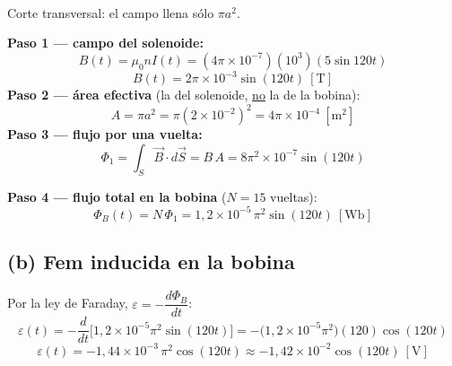 \documentclass[12pt,letterpaper]{article}
\begin{document}
\medskip
\noindent
\begin{minipage}[t]{0.36\textwidth}
\centering\vspace{0pt}
\\[2pt]
{\footnotesize Corte transversal: el campo llena s\'olo $\pi a^2$.}
\end{minipage}%
\hfill
\begin{minipage}[t]{0.60\textwidth}
\vspace{0pt}
\textbf{Paso 1 — campo del solenoide:}
\[
    B(t)=\mu_0 n I(t)=(4\pi\times10^{-7})(10^{3})(5\sin 120t)
\]
\[
    B(t)=2\pi\times10^{-3}\sin(120t)\ [\text{T}]
\]
\textbf{Paso 2 — \'area efectiva} (la del solenoide, \underline{no} la de la bobina):
\[
    A=\pi a^{2}=\pi(2\times10^{-2})^{2}=4\pi\times10^{-4}\ [\text{m}^2]
\]
\textbf{Paso 3 — flujo por una vuelta:}
\[
    \Phi_1=\int_S\vec B\cdot d\vec S=B\,A=8\pi^{2}\times10^{-7}\sin(120t)
\]
\end{minipage}

\medskip
\noindent\textbf{Paso 4 — flujo total en la bobina} ($N=15$ vueltas):
\[
    \boxed{\Phi_B(t)=N\,\Phi_1=1{,}2\times10^{-5}\,\pi^{2}\sin(120t)\ [\text{Wb}]}
\]

\subsection*{(b) Fem inducida en la bobina}

Por la ley de Faraday, $\varepsilon=-\dfrac{d\Phi_B}{dt}$:
\[
    \varepsilon(t)=-\frac{d}{dt}\Big[1{,}2\times10^{-5}\pi^{2}\sin(120t)\Big]
    =-\big(1{,}2\times10^{-5}\pi^{2}\big)(120)\cos(120t)
\]
\[
    \boxed{\varepsilon(t)=-1{,}44\times10^{-3}\,\pi^{2}\cos(120t)\approx-1{,}42\times10^{-2}\cos(120t)\ [\text{V}]}
\]
\end{document}
